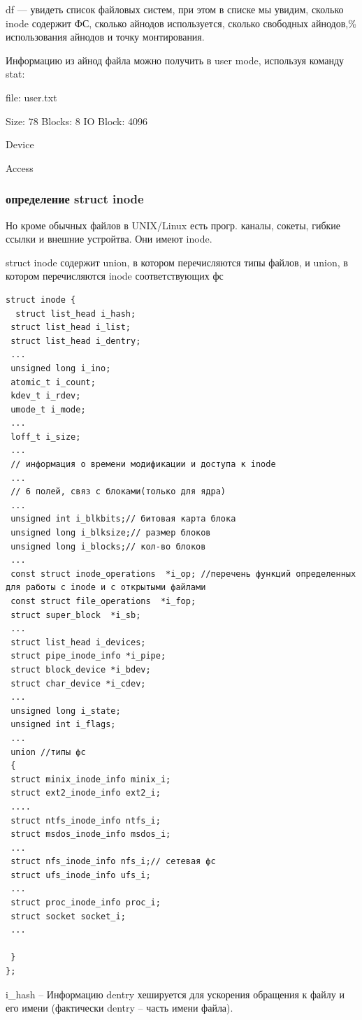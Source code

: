 df --- увидеть список файловых систем, при этом в списке мы увидим, сколько inode содержит ФС, сколько айнодов используется, сколько свободных айнодов,\% использования айнодов и точку монтирования.

Информацию из айнод файла можно получить в user mode, используя команду stat:

file: user.txt

Size: 78   Blocks: 8     IO Block: 4096

Device 

Access

\subsubsection{определение struct inode}

Но кроме обычных файлов в UNIX/Linux есть прогр. каналы, сокеты, гибкие ссылки и внешние устройтва. Они имеют inode.

struct inode содержит union, в котором перечисляются типы файлов, и union, в котором перечисляются inode соответствующих фс

\begin{lstlisting}
struct inode {
  struct list_head i_hash;
 struct list_head i_list;
 struct list_head i_dentry;
 ...
 unsigned long i_ino;
 atomic_t i_count;
 kdev_t i_rdev;
 umode_t i_mode;
 ...
 loff_t i_size;
 ...
 // информация о времени модификации и доступа к inode
 ...
 // 6 полей, связ с блоками(только для ядра)
 ...
 unsigned int i_blkbits;// битовая карта блока
 unsigned long i_blksize;// размер блоков
 unsigned long i_blocks;// кол-во блоков
 ...
 const struct inode_operations  *i_op; //перечень функций определенных для работы с inode и c открытыми файлами
 const struct file_operations  *i_fop; 
 struct super_block  *i_sb; 
 ...
 struct list_head i_devices;
 struct pipe_inode_info *i_pipe;
 struct block_device *i_bdev;
 struct char_device *i_cdev;
 ...
 unsigned long i_state;
 unsigned int i_flags;
 ...
 union //типы фс
 {
 struct minix_inode_info minix_i;
 struct ext2_inode_info ext2_i;
 ....
 struct ntfs_inode_info ntfs_i;
 struct msdos_inode_info msdos_i;
 ...
 struct nfs_inode_info nfs_i;// сетевая фс
 struct ufs_inode_info ufs_i;
 ...
 struct proc_inode_info proc_i;
 struct socket socket_i;
 ...
 
 }
};
\end{lstlisting}


i\_hash -- Информацию dentry хешируется для ускорения обращения к файлу и его имени (фактически dentry -- часть имени файла).

